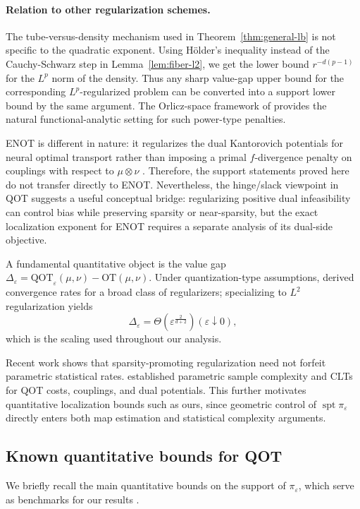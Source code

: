 \documentclass{article}
\theoremstyle{plain}
\theoremstyle{definition}
\theoremstyle{remark}
\numberwithin{equation}{section}
\DeclareMathOperator{\spt}{spt}
\newcommand{\OT}{\mathrm{OT}}
\newcommand{\QOT}{\mathrm{QOT}}
\begin{document}
\paragraph{Relation to other regularization schemes.}
The tube-versus-density mechanism used in Theorem~\ref{thm:general-lb} is not specific to the quadratic exponent. 
Using H\"older's inequality instead of the Cauchy-Schwarz step in Lemma~\ref{lem:fiber-l2}, we get the lower bound $r^{-d(p-1)}$ for the $L^p$ norm of the density. 
Thus any sharp value-gap upper bound for the corresponding $L^p$-regularized problem can be converted into a support lower bound by the same argument.
The Orlicz-space framework of \citet{lorenz2022orlicz} provides the natural functional-analytic setting for such power-type penalties.

ENOT is different in nature: it regularizes the dual Kantorovich potentials for neural optimal transport rather than imposing a primal $f$-divergence penalty on couplings with respect to $\mu\otimes\nu$ \citep{buzun2024expectile}. 
Therefore, the support statements proved here do not transfer directly to ENOT. 
Nevertheless, the hinge/slack viewpoint in QOT suggests a useful conceptual bridge: regularizing positive dual infeasibility can control bias while preserving sparsity or near-sparsity, but the exact localization exponent for ENOT requires a separate analysis of its dual-side objective.

A fundamental quantitative object is the value gap $\Delta_\varepsilon=\QOT_\varepsilon(\mu,\nu)-\OT(\mu,\nu)$.
Under quantization-type assumptions, \citet{eckstein2024convergence} derived convergence rates for a broad class of regularizers; specializing to $L^2$ regularization yields
$$
\Delta_\varepsilon=\Theta\left(\varepsilon^{\frac{2}{d+2}}\right)(\varepsilon\downarrow0),
$$
which is the scaling used throughout our analysis.

Recent work shows that sparsity-promoting regularization need not forfeit parametric statistical rates.
\citet{gonzalez2025sample} established parametric sample complexity and CLTs for QOT costs, couplings, and dual potentials.
This further motivates quantitative localization bounds such as ours, since geometric control of $\spt\pi_\varepsilon$ directly enters both map estimation and statistical complexity arguments.

\subsection{Known quantitative bounds for QOT}\label{sec:known}
We briefly recall the main quantitative bounds on the support of $\pi_\varepsilon$, which serve as benchmarks for our results \citep{gonzalez2024sparsity,wiesel2025sparsity}. 
\end{document}
